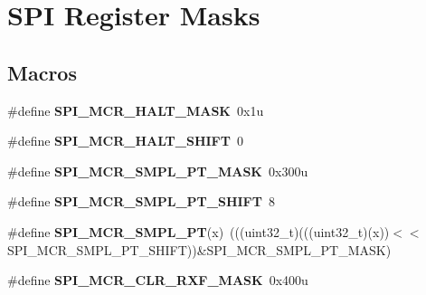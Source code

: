 \hypertarget{group__SPI__Register__Masks}{}\section{S\+PI Register Masks}
\label{group__SPI__Register__Masks}
\subsection*{Macros}
\begin{DoxyCompactItemize}
\item 
\#define {\bfseries S\+P\+I\+\_\+\+M\+C\+R\+\_\+\+H\+A\+L\+T\+\_\+\+M\+A\+SK}~0x1u\hypertarget{group__SPI__Register__Masks_ga88c670302548b2d5b5f032b5709bc366}{}\label{group__SPI__Register__Masks_ga88c670302548b2d5b5f032b5709bc366}

\item 
\#define {\bfseries S\+P\+I\+\_\+\+M\+C\+R\+\_\+\+H\+A\+L\+T\+\_\+\+S\+H\+I\+FT}~0\hypertarget{group__SPI__Register__Masks_ga8f13f49cf8502462271d8a179338d81b}{}\label{group__SPI__Register__Masks_ga8f13f49cf8502462271d8a179338d81b}

\item 
\#define {\bfseries S\+P\+I\+\_\+\+M\+C\+R\+\_\+\+S\+M\+P\+L\+\_\+\+P\+T\+\_\+\+M\+A\+SK}~0x300u\hypertarget{group__SPI__Register__Masks_gaebb0539e04af465a39892f5aaabc872d}{}\label{group__SPI__Register__Masks_gaebb0539e04af465a39892f5aaabc872d}

\item 
\#define {\bfseries S\+P\+I\+\_\+\+M\+C\+R\+\_\+\+S\+M\+P\+L\+\_\+\+P\+T\+\_\+\+S\+H\+I\+FT}~8\hypertarget{group__SPI__Register__Masks_ga1ffc13b9075cc6b0b34ea3162d6c1b74}{}\label{group__SPI__Register__Masks_ga1ffc13b9075cc6b0b34ea3162d6c1b74}

\item 
\#define {\bfseries S\+P\+I\+\_\+\+M\+C\+R\+\_\+\+S\+M\+P\+L\+\_\+\+PT}(x)~(((uint32\+\_\+t)(((uint32\+\_\+t)(x))$<$$<$S\+P\+I\+\_\+\+M\+C\+R\+\_\+\+S\+M\+P\+L\+\_\+\+P\+T\+\_\+\+S\+H\+I\+FT))\&S\+P\+I\+\_\+\+M\+C\+R\+\_\+\+S\+M\+P\+L\+\_\+\+P\+T\+\_\+\+M\+A\+SK)\hypertarget{group__SPI__Register__Masks_ga85a76d4d3ea961f858f6eed9882bfd99}{}\label{group__SPI__Register__Masks_ga85a76d4d3ea961f858f6eed9882bfd99}

\item 
\#define {\bfseries S\+P\+I\+\_\+\+M\+C\+R\+\_\+\+C\+L\+R\+\_\+\+R\+X\+F\+\_\+\+M\+A\+SK}~0x400u\hypertarget{group__SPI__Register__Masks_gaedd370380f06f2e4bf2ca01babda8732}{}\label{group__SPI__Register__Masks_gaedd370380f06f2e4bf2ca01babda8732}


\end{DoxyCompactItemize}
